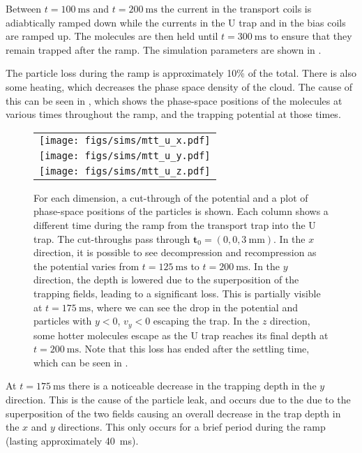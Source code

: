 Between $t=\SI{100}{\milli\second}$ and $t=\SI{200}{\milli\second}$ the current
in the transport coils is adiabtically ramped down while the currents in
the U trap and in the bias coils are ramped up. The molecules are then held
until $t=\SI{300}{\milli\second}$ to ensure that they remain trapped after the
ramp. The simulation parameters are shown in
.

The particle loss during the ramp is approximately 10\% of the total. There is
also some heating, which decreases the phase space density of the cloud. The
cause of this can be seen in , which shows the
phase-space positions of the molecules at various times throughout the ramp,
and the trapping potential at those times.

\begin{figure}[p]
\centering
  \begin{tabular}{c}
    \texttt{[image: figs/sims/mtt\_u\_x.pdf]} \\
    \texttt{[image: figs/sims/mtt\_u\_y.pdf]} \\
    \texttt{[image: figs/sims/mtt\_u\_z.pdf]}
  \end{tabular}
  \caption{
    For each dimension, a cut-through of the potential and a plot of
    phase-space positions of the particles is shown. Each column shows a
    different time during the ramp from the transport trap into the U trap. The
    cut-throughs pass through $\mathbf{t}_0 = (0, 0, \SI{3}{\milli\meter})$. In
    the $x$ direction, it is possible to see decompression and recompression as
    the potential varies from $t=\SI{125}{\milli\second}$ to
    $t=\SI{200}{\milli\second}$. In the $y$ direction, the depth is lowered due
    to the superposition of the trapping fields, leading to a significant loss.
    This is partially visible at $t=\SI{175}{\milli\second}$, where we can see
    the drop in the potential and particles with $y<0$, $v_y<0$ escaping the
    trap. In the $z$ direction, some hotter molecules escape as the U trap
    reaches its final depth at $t=\SI{200}{\milli\second}$. Note that this loss
    has ended after the settling time, which can be seen in
    .
  }
  \label{design:fig:trans_U}
\end{figure}

At $t=\SI{175}{\milli\second}$ there is a noticeable decrease in the trapping
depth in the $y$ direction. This is the cause of the particle leak, and occurs
due to the due to the superposition of the two fields causing an overall
decrease in the trap depth in the $x$ and $y$ directions. This only occurs for
a brief period during the ramp (lasting approximately \SI{40}{\milli\second}). 

